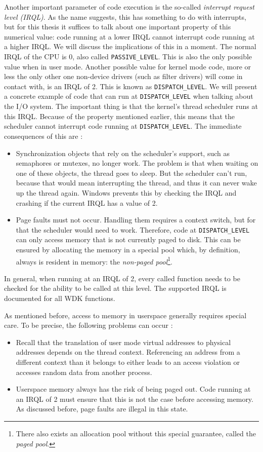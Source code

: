 Another important parameter of code execution is the so-called \emph{interrupt request level (IRQL)}. As the name suggests, this has something to do with interrupts, but for this thesis it suffices to talk about one important property of this numerical value: code running at a lower IRQL cannot interrupt code running at a higher IRQL. We will discuss the implications of this in a moment. The normal IRQL of the CPU is 0, also called \texttt{PASSIVE\_LEVEL}. This is also the only possible value when in user mode. Another possible value for kernel mode code, more or less the only other one non-device drivers (such as filter drivers) will come in contact with, is an IRQL of 2. This is known as \texttt{DISPATCH\_LEVEL}. We will present a concrete example of code that can run at \texttt{DISPATCH\_LEVEL} when talking about the I/O system. The important thing is that the kernel's thread scheduler runs at this IRQL. Because of the property mentioned earlier, this means that the scheduler cannot interrupt code running at \texttt{DISPATCH\_LEVEL}. The immediate consequences of this are \cite{Yosifovich2017}:
\begin{itemize}
	\item Synchronization objects that rely on the scheduler's support, such as semaphores or mutexes, no longer work. The problem is that when waiting on one of these objects, the thread goes to sleep. But the scheduler can't run, because that would mean interrupting the thread, and thus it can never wake up the thread again. Windows prevents this by checking the IRQL and crashing if the current IRQL has a value of 2.
	\item Page faults must not occur. Handling them requires a context switch, but for that the scheduler would need to work. Therefore, code at \texttt{DISPATCH\_LEVEL} can only access memory that is not currently paged to disk. This can be ensured by allocating the memory in a special pool which, by definition, always is resident in memory: the \emph{non-paged pool}\footnote{\label{fn:background.kerneldriver.pagedpool} There also exists an allocation pool without this special guarantee, called the \emph{paged pool}.}.
\end{itemize}
In general, when running at an IRQL of 2, every called function needs to be checked for the ability to be called at this level. The supported IRQL is documented for all WDK functions.

As mentioned before, access to memory in userspace generally requires special care. To be precise, the following problems can occur \cite{Yosifovich2017}:
\begin{itemize}
	\item Recall that the translation of user mode virtual addresses to physical addresses depends on the thread context. Referencing an address from a different context than it belongs to either leads to an access violation or accesses random data from another process.
	\item Userspace memory always has the risk of being paged out. Code running at an IRQL of 2 must ensure that this is not the case before accessing memory. As discussed before, page faults are illegal in this state.
\end{itemize}

